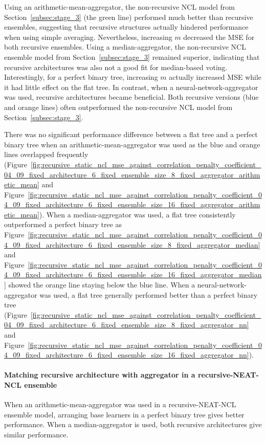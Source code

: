 Using an arithmetic-mean-aggregator, the non-recursive NCL model from Section~\ref{subsec:stage_3} (the green line) performed much better than recursive ensembles, suggesting that recursive structures actually hindered performance when using simple averaging. Nevertheless, increasing $m$ decreased the MSE for both recursive ensembles. Using a median-aggregator, the non-recursive NCL ensemble model from Section~\ref{subsec:stage_3} remained superior, indicating that recursive architectures was also not a good fit for median-based voting. Interestingly, for a perfect binary tree, increasing $m$ actually increased MSE while it had little effect on the flat tree. In contrast, when a neural-network-aggregator was used, recursive architectures became beneficial. Both recursive versions (blue and orange lines) often outperformed the non-recursive NCL model from Section~\ref{subsec:stage_3}. 

There was no significant performance difference between a flat tree and a perfect binary tree when an arithmetic-mean-aggregator was used as the blue and orange lines overlapped frequently (Figure~\ref{fig:recursive_static_ncl_mse_against_correlation_penalty_coefficient_04_09_fixed_architecture_6_fixed_ensemble_size_8_fixed_aggregator_arithmetic_mean} and Figure~\ref{fig:recursive_static_ncl_mse_against_correlation_penalty_coefficient_04_09_fixed_architecture_6_fixed_ensemble_size_16_fixed_aggregator_arithmetic_mean}). When a median-aggregator was used, a flat tree consistently outperformed a perfect binary tree as Figure~\ref{fig:recursive_static_ncl_mse_against_correlation_penalty_coefficient_04_09_fixed_architecture_6_fixed_ensemble_size_8_fixed_aggregator_median} and Figure~\ref{fig:recursive_static_ncl_mse_against_correlation_penalty_coefficient_04_09_fixed_architecture_6_fixed_ensemble_size_16_fixed_aggregator_median} showed the orange line staying below the blue line. When a neural-network-aggregator was used, a flat tree generally performed better than a perfect binary tree (Figure~\ref{fig:recursive_static_ncl_mse_against_correlation_penalty_coefficient_04_09_fixed_architecture_6_fixed_ensemble_size_8_fixed_aggregator_nn} and Figure~\ref{fig:recursive_static_ncl_mse_against_correlation_penalty_coefficient_04_09_fixed_architecture_6_fixed_ensemble_size_16_fixed_aggregator_nn}). 

\paragraph{Matching recursive architecture with aggregator in a recursive-NEAT-NCL ensemble}
When an arithmetic-mean-aggregator was used in a recursive-NEAT-NCL ensemble model, arranging base learners in a perfect binary tree gives better performance. When a median-aggregator is used, both recursive architectures give similar performance. 

